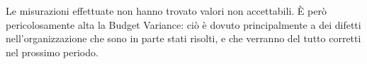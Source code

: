 Le misurazioni effettuate non hanno trovato valori non accettabili.\newline
\`E però pericolosamente alta la Budget Variance: ciò è dovuto principalmente a dei difetti nell'organizzazione che sono in parte stati risolti, e che verranno del tutto corretti nel prossimo periodo.